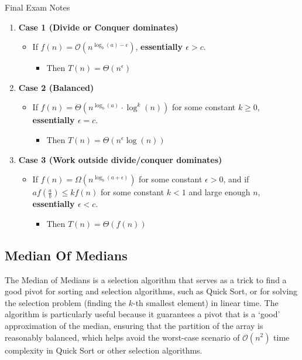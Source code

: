 \begin{examnotes}{Final Exam Notes}
\begin{highlight}
        \begin{enumerate}
            \item \textbf{Case 1 (Divide or Conquer dominates)}
            \begin{itemize}
                \item If $f(n) = \mathcal{O}(n^{\log_{b}{(a)} - \epsilon})$, \textbf{essentially $\epsilon > c$}.
                \begin{itemize}
                    \item Then $T(n) = \Theta(n^{\epsilon})$
                \end{itemize}
            \end{itemize}
            \item \textbf{Case 2 (Balanced)}
            \begin{itemize}
                \item If $f(n) = \Theta(n^{\log_{b}{(a)}} \cdot \log^{k}{(n)})$ for some constant $k \geq 0$, \textbf{essentially $\epsilon = c$}.
                \begin{itemize}
                    \item Then $T(n) = \Theta(n^{\epsilon}\log{(n)})$
                \end{itemize}
            \end{itemize}
            \item \textbf{Case 3 (Work outside divide/conquer dominates)}
            \begin{itemize}
                \item If $f(n) = \Omega(n^{\log_{b}{(a + \epsilon)}})$ for some constant $\epsilon > 0$, and if $af\left(\frac{a}{b}\right) \leq k f(n)$ for some constant $k < 1$ and large enough $n$,
                \textbf{essentially $\epsilon < c$}.
                \begin{itemize}
                    \item Then $T(n) = \Theta(f(n))$
                \end{itemize}
            \end{itemize}
        \end{enumerate}
    \end{highlight}

    \subsection*{Median Of Medians}

    The Median of Medians is a selection algorithm that serves as a trick to find a good pivot for sorting and selection algorithms, such as Quick Sort, or for solving the selection problem (finding 
    the $k$-th smallest element) in linear time. The algorithm is particularly useful because it guarantees a pivot that is a `good' approximation of the median, ensuring that the partition of the 
    array is reasonably balanced, which helps avoid the worst-case scenario of $\mathcal{O}(n^{2})$ time complexity in Quick Sort or other selection algorithms.


\end{examnotes}
